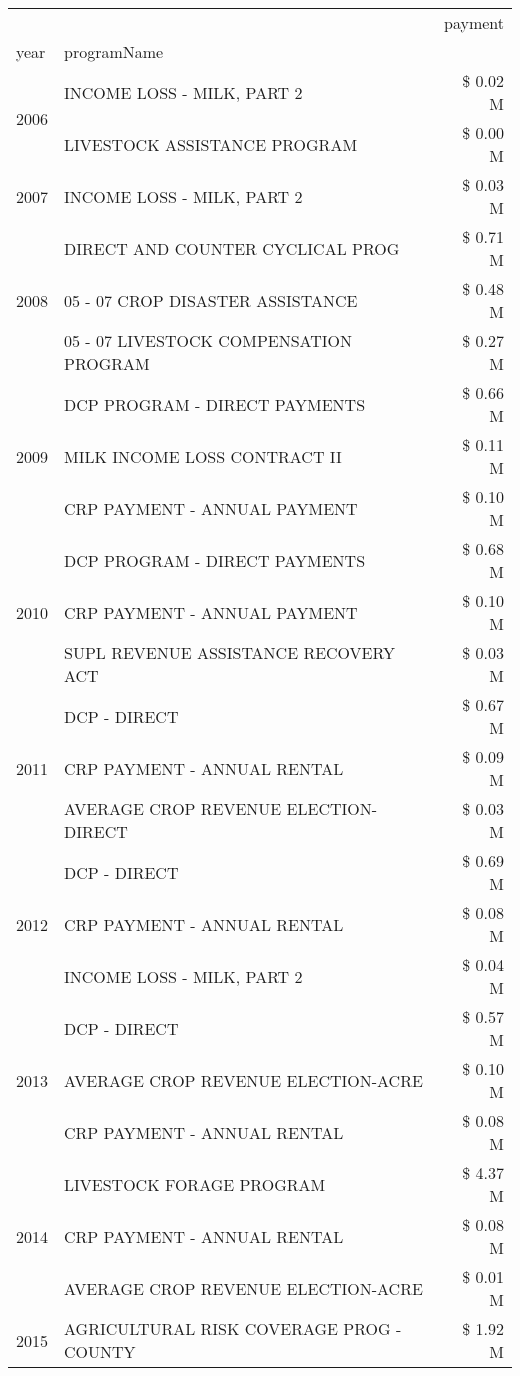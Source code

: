 \begin{tabular}{llr}
\toprule
 &  & payment \\
year & programName &  \\
\midrule
\multirow[t]{2}{*}{2006} & INCOME LOSS - MILK, PART 2 & \$ 0.02 M \\
 & LIVESTOCK ASSISTANCE PROGRAM & \$ 0.00 M \\
\cline{1-3}
2007 & INCOME LOSS - MILK, PART 2 & \$ 0.03 M \\
\cline{1-3}
\multirow[t]{3}{*}{2008} & DIRECT AND COUNTER CYCLICAL PROG & \$ 0.71 M \\
 & 05 - 07 CROP DISASTER ASSISTANCE & \$ 0.48 M \\
 & 05 - 07 LIVESTOCK COMPENSATION PROGRAM & \$ 0.27 M \\
\cline{1-3}
\multirow[t]{3}{*}{2009} & DCP PROGRAM - DIRECT PAYMENTS & \$ 0.66 M \\
 & MILK INCOME LOSS CONTRACT II & \$ 0.11 M \\
 & CRP PAYMENT - ANNUAL PAYMENT & \$ 0.10 M \\
\cline{1-3}
\multirow[t]{3}{*}{2010} & DCP PROGRAM - DIRECT PAYMENTS & \$ 0.68 M \\
 & CRP PAYMENT - ANNUAL PAYMENT & \$ 0.10 M \\
 & SUPL REVENUE ASSISTANCE RECOVERY ACT & \$ 0.03 M \\
\cline{1-3}
\multirow[t]{3}{*}{2011} & DCP - DIRECT & \$ 0.67 M \\
 & CRP PAYMENT - ANNUAL RENTAL & \$ 0.09 M \\
 & AVERAGE CROP REVENUE ELECTION-DIRECT & \$ 0.03 M \\
\cline{1-3}
\multirow[t]{3}{*}{2012} & DCP - DIRECT & \$ 0.69 M \\
 & CRP PAYMENT - ANNUAL RENTAL & \$ 0.08 M \\
 & INCOME LOSS - MILK, PART 2 & \$ 0.04 M \\
\cline{1-3}
\multirow[t]{3}{*}{2013} & DCP - DIRECT & \$ 0.57 M \\
 & AVERAGE CROP REVENUE ELECTION-ACRE & \$ 0.10 M \\
 & CRP PAYMENT - ANNUAL RENTAL & \$ 0.08 M \\
\cline{1-3}
\multirow[t]{3}{*}{2014} & LIVESTOCK FORAGE PROGRAM & \$ 4.37 M \\
 & CRP PAYMENT - ANNUAL RENTAL & \$ 0.08 M \\
 & AVERAGE CROP REVENUE ELECTION-ACRE & \$ 0.01 M \\
\cline{1-3}
\multirow[t]{3}{*}{2015} & AGRICULTURAL RISK COVERAGE PROG - COUNTY & \$ 1.92 M \\

\end{tabular}
